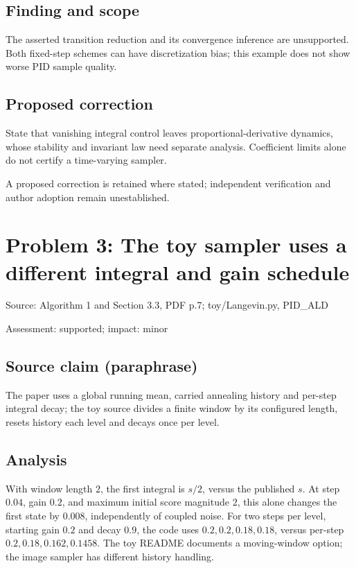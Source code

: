 \documentclass[11pt]{article}
\begin{document}
\subsection*{Finding and scope}

The asserted transition reduction and its convergence inference are unsupported. Both fixed-step schemes can have discretization bias; this example does not show worse PID sample quality.

\subsection*{Proposed correction}

State that vanishing integral control leaves proportional-derivative dynamics, whose stability and invariant law need separate analysis. Coefficient limits alone do not certify a time-varying sampler.

A proposed correction is retained where stated; independent verification and author adoption remain unestablished.

\section*{Problem 3: The toy sampler uses a different integral and gain schedule}

Source: Algorithm 1 and Section 3.3, PDF p.7; toy/Langevin.py, PID\_ALD

Assessment: supported; impact: minor

\subsection*{Source claim (paraphrase)}

The paper uses a global running mean, carried annealing history and per-step integral decay; the toy source divides a finite window by its configured length, resets history each level and decays once per level.

\subsection*{Analysis}

With window length \(2\), the first integral is \(s/2\), versus the published \(s\). At step \(0.04\), gain \(0.2\), and maximum initial score magnitude \(2\), this alone changes the first state by \(0.008\), independently of coupled noise. For two steps per level, starting gain \(0.2\) and decay \(0.9\), the code uses \(0.2,0.2,0.18,0.18\), versus per-step \(0.2,0.18,0.162,0.1458\). The toy README documents a moving-window option; the image sampler has different history handling.
\end{document}
